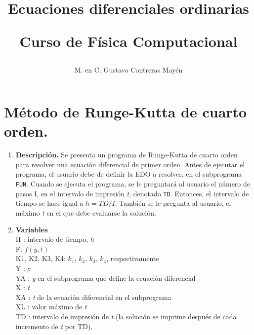 \documentclass[11pt]{article}
\title{Ecuaciones diferenciales ordinarias \\ \begin{large}Curso de Física Computacional\end{large}}
\author{M. en C. Gustavo Contreras Mayén}
\date{ }
\begin{document}
\maketitle
\section*{Método de Runge-Kutta de cuarto orden.}
\begin{enumerate}
\item \textbf{ Descripción.}
Se presenta un programa de Runge-Kutta de cuarto orden para resolver una ecuación diferencial de primer orden. Antes de ejecutar el programa, el usuario debe de definir la EDO a resolver, en el subprograma \texttt{FUN}. Cuando se ejecuta el programa, se le preguntará al usuario el número de pasos I, en el intervalo de impresión \textit{t}, denotado \texttt{TD}. Entonces, el intervalo de tiempo se hace igual a $h = TD/I$. También se le pregunta al usuario, el máximo \textit{t} en el que debe evaluarse la solución.
\item \textbf{Variables} \\
H : intervalo de tiempo, \textit{h} \\
F: $f(y,t)$ \\
K1, K2, K3, K4: $k_{1}$, $k_{2}$, $k_{3}$, $k_{4}$, respectivamente \\
Y : y \\
YA : \textit{y} en el subprograma que define la ecuación diferencial \\
X : \textit{t} \\
XA : \textit{t} de la ecuación diferencial en el subprograma \\
XL : valor máximo de \textit{t} \\
TD : intervalo de impresión de \textit{t} (la solución se imprime después de cada incremento de \textit{t} por TD).
\end{enumerate}
\end{document}
